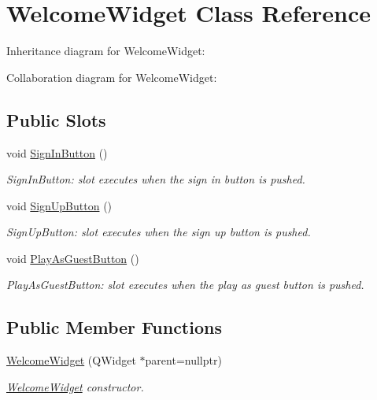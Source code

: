 \hypertarget{classWelcomeWidget}{}\section{Welcome\+Widget Class Reference}
\label{classWelcomeWidget}


Inheritance diagram for Welcome\+Widget\+:


Collaboration diagram for Welcome\+Widget\+:
\subsection*{Public Slots}
\begin{DoxyCompactItemize}
\item 
void \hyperlink{classWelcomeWidget_abd744cc72e89fc94825bcbce670181d0}{Sign\+In\+Button} ()
\begin{DoxyCompactList}\small\item\em Sign\+In\+Button\+: slot executes when the sign in button is pushed. \end{DoxyCompactList}\item 
void \hyperlink{classWelcomeWidget_a3c90bf38f03e2892d4a990ba3cdcf958}{Sign\+Up\+Button} ()
\begin{DoxyCompactList}\small\item\em Sign\+Up\+Button\+: slot executes when the sign up button is pushed. \end{DoxyCompactList}\item 
void \hyperlink{classWelcomeWidget_adf8132423915c0d69ac51c9cb4cec04b}{Play\+As\+Guest\+Button} ()
\begin{DoxyCompactList}\small\item\em Play\+As\+Guest\+Button\+: slot executes when the play as guest button is pushed. \end{DoxyCompactList}\end{DoxyCompactItemize}
\subsection*{Public Member Functions}
\begin{DoxyCompactItemize}
\item 
\hyperlink{classWelcomeWidget_a8098178a4ddbc597a6afe1a151fd40a6}{Welcome\+Widget} (Q\+Widget $\ast$parent=nullptr)
\begin{DoxyCompactList}\small\item\em \hyperlink{classWelcomeWidget}{Welcome\+Widget} constructor. \end{DoxyCompactList}\end{DoxyCompactItemize}
